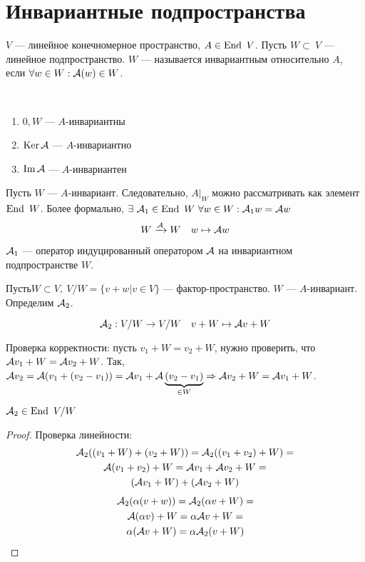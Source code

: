 \documentclass[main]{subfiles}
\begin{document}
\chapter{Инвариантные подпространства}

\begin{definition}
   $V$ — линейное конечномерное пространство, $A\in \operatorname{End} \ V$. Пусть $W\subset \ V$ — линейное подпространство. 
   $W$ — называется инвариантным относительно $A$, если $\forall w\in W : \mathcal{A}(w) \in W$.
\end{definition}

\begin{propertylist} 
    \
    \begin{enumerate}
        \item $0, W$ — $A$-инвариантны
        \item $\operatorname{Ker} \mathcal{A}$ — $A$-инвариантно
        \item $\operatorname{Im} \mathcal{A}$ — $A$-инвариантен
    \end{enumerate}
\end{propertylist}
    


Пусть $W$ — $A$-инвариант. Следовательно, $A|_W$ можно рассматривать как элемент $\End \ W$. 
Более формально, $\exists\  \mathcal{A}_1 \in \operatorname{End} \ W \ \forall w \in W : \mathcal{A}_1 w=\mathcal{A} w$
\[W\xrightarrow{\mathcal{A}} W \quad w\mapsto \mathcal{A} w\]

$\mathcal{A}_1$  —  оператор индуцированный оператором $\mathcal{A}$ на инвариантном подпространстве $W$.

$Пусть W\subset V,\ V/W = \{ v+w |v \in V\}$ — фактор-пространство.  $W$ — $A$-инвариант.
Определим $\mathcal{A}_2$.

\[\mathcal{A}_2: V/W \rightarrow V/W \quad v+W \mapsto \mathcal{A} v+W\]

Проверка корректности: пусть $v_1+W = v_2+W$, нужно проверить, что $\mathcal{A} v_1+W=\mathcal{A} v_2 + W$. Так, $\mathcal{A} v_2= \mathcal{A}(v_1+(v_2-v_1))=\mathcal{A} v_1+ \mathcal{A}\underbrace{(v_2-v_1)}_{\in W} \Rightarrow
 \mathcal{A} v_2 + W= \mathcal{A} v_1+W$.

\begin{proposition} {}
$\mathcal{A}_2 \in \operatorname{End} \ V/W$
\end{proposition}

\begin{proof}
    Проверка линейности:
    \begin{multline*}
        \mathcal{A}_2((v_1+W)+(v_2+W))= \mathcal{A}_2((v_1+v_2)+W)=\\
        \mathcal{A}(v_1+v_2)+W=  \mathcal{A} v_1+\mathcal{A} v_2+W=\\
        (\mathcal{A} v_1+W)+(\mathcal{A} v_2+W)
    \end{multline*}
    \begin{multline*}
        \mathcal{A}_2(\alpha(v+w))= \mathcal{A}_2(\alpha v+W)=\\
        \mathcal{A}(\alpha v)+W= \alpha \mathcal{A} v +W=\\
        \alpha(\mathcal{A} v +W) = \alpha \mathcal{A}_2(v+W)
    \end{multline*}
\end{proof}
\end{document}
